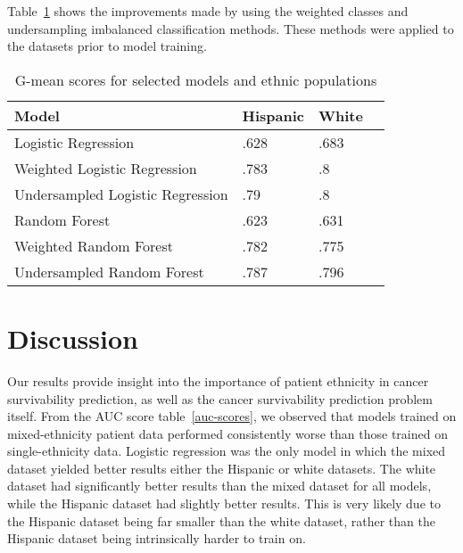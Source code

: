 \documentclass[review]{elsarticle}
\begin{document}
Table~\ref{gmean-compare} shows the improvements made by using the weighted classes and undersampling imbalanced classification methods. These methods were applied to the datasets prior to model training.
\begin{table}[H]
	\centering
	\begin{tabular}{llll}
		\textbf{Model}               & \textbf{Hispanic} & \textbf{White} &   \\ \hline
		Logistic Regression          & .628              & .683           &   \\
		Weighted Logistic Regression & .783              & .8             &   \\
		Undersampled Logistic Regression & .79 & .8 & \\ 
		Random Forest                & .623              & .631           &   \\
		Weighted Random Forest       & .782              & .775           &  \\
		Undersampled Random Forest & .787 & .796
	\end{tabular}
	\caption{G-mean scores for selected models and ethnic populations}
	\label{gmean-compare}
\end{table}

\section{Discussion}
Our results provide insight into the importance of patient ethnicity in cancer survivability prediction, as well as the cancer survivability prediction problem itself. From the AUC score table~\ref{auc-scores}, we observed that models trained on mixed-ethnicity patient data performed consistently worse than those trained on single-ethnicity data. Logistic regression was the only model in which the mixed dataset yielded better results either the Hispanic or white datasets. The white dataset had significantly better results than the mixed dataset for all models, while the Hispanic dataset had slightly better results. This is very likely due to the Hispanic dataset being far smaller than the white dataset, rather than the Hispanic dataset being intrinsically harder to train on. 
\end{document}
